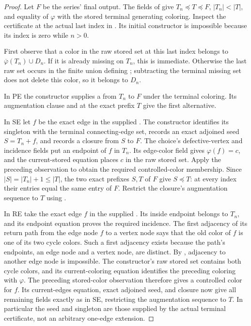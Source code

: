 \begin{proof}
Let $F$ be the series' final output.  The fields of
 give $T_n\preccurlyeq T\preccurlyeq F$,
$|T_n|<|T|$, and equality of $\varphi$ with the stored terminal
generating coloring.  Inspect the certificate at the actual last index
in .  Its initial constructor is impossible
because its index is zero while $n>0$.

First observe that a color in the raw stored set at this last index
belongs to $\overline\varphi(T_n)\cup D_n$.  If it is already missing
on $T_n$, this is immediate.  Otherwise the last raw set occurs in the
finite union defining ; subtracting the
terminal missing set does not delete this color, so it belongs to $D_n$.

In PE the constructor supplies a  from $T_n$
to $F$ under the terminal coloring.  Its augmentation clause and
 at the exact prefix $T$
give the first alternative.

In SE let $f$ be the exact edge in the supplied
.  The constructor identifies its
singleton with the terminal connecting-edge set, records an exact
adjoined seed $S=T_n+f$, and records a closure from $S$ to $F$.
The choice's defective-vertex and incidence fields put an endpoint of
$f$ in $T_n$.  Its edge-color field gives
$\varphi(f)=c$, and the current-stored equation places $c$ in the raw
stored set.  Apply the preceding observation to obtain the required
controlled-color membership.  Since $|S|=|T_n|+1\le |T|$, the two exact
prefixes $S,T$ of $F$ give $S\preccurlyeq T$: at every index their
entries equal the same entry of $F$.
Restrict the closure's augmentation sequence to $T$ using
.

In RE take the exact edge $f$ in the supplied
.  Its inside endpoint belongs
to $T_n$, and its endpoint equation proves the required incidence.
The first adjacency of its return path from the edge node $f$ to a
vertex node says that the old color of $f$ is one of its two cycle
colors.  Such a first adjacency exists because the path's endpoints,
an edge node and a vertex node, are distinct.  By
, adjacency to another edge node is
impossible.  The constructor's raw stored set contains both cycle
colors, and its current-coloring equation identifies the preceding
coloring with $\varphi$.  The preceding stored-color observation
therefore gives a controlled color for $f$.  Its current-edges equation,
exact adjoined seed, and closure now give all remaining fields exactly
as in SE, restricting the augmentation sequence to $T$.
In particular the seed and singleton are those supplied by the actual
terminal certificate, not an arbitrary one-edge extension.
\end{proof}

